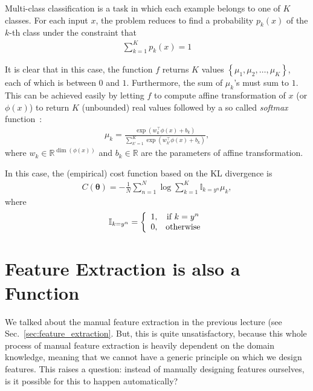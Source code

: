 \documentclass{report}
\newcommand{\vects}[1]{\boldsymbol{#1}}
\newcommand{\TT}[0]{\vects{\theta}}
\newcommand{\RR}[0]{\mathbb{R}}
\newcommand{\II}[0]{\mathbb{I}}
\begin{document}
Multi-class classification is a task in which each example belongs to one of $K$
classes. For each input $x$, the problem reduces to find a probability $p_k(x)$
of the $k$-th class under the constraint that 
\begin{align*}
    \sum_{k=1}^K p_k(x)=1
\end{align*}

It is clear that in this case, the function $f$ returns $K$ values $\left\{
\mu_1, \mu_2, \ldots, \mu_K \right\}$, each of which is between $0$ and $1$.
Furthermore, the sum of $\mu_k$'s must sum to $1$. This can be achieved easily
by letting $f$ to compute affine transformation of $x$ (or $\phi(x)$) to return
$K$ (unbounded) real values followed by a so called {\em softmax}
function~\cite{Bridle1990}:
\begin{align}
    \label{eq:softmax}
    \mu_k = \frac{\exp(w_k^\top \phi(x) + b_k)}{\sum_{k'=1}^K \exp(w_{k'}^\top
    \phi(x) + b_k)},
\end{align}
where $w_k \in \RR^{\dim(\phi(x))}$ and $b_k \in \RR$ are the parameters of
affine transformation.

In this case, the (empirical) cost function based on the KL divergence is
\begin{align}
    \label{eq:cat_crossentropy}
    C(\TT) = -\frac{1}{N} \sum_{n=1}^N \log \sum_{k=1}^K \II_{k=y^n} \mu_k,
\end{align}
where 
\begin{align}
    \label{eq:indicator_function}
    \II_{k=y^n} = \left\{ 
        \begin{array}{c c}
            1, & \text{if }k=y^n \\
            0, & \text{otherwise}
        \end{array}
        \right.
\end{align}

\section{Feature Extraction is also a Function}
\label{sec:feature_ext}

We talked about the manual feature extraction in the previous lecture (see
Sec.~\ref{sec:feature_extraction}. But, this is quite unsatisfactory, because
this whole process of manual feature extraction is heavily dependent on the
domain knowledge, meaning that we cannot have a generic principle on which we
design features. This raises a question: instead of manually designing features
ourselves, is it possible for this to happen automatically?
\end{document}
